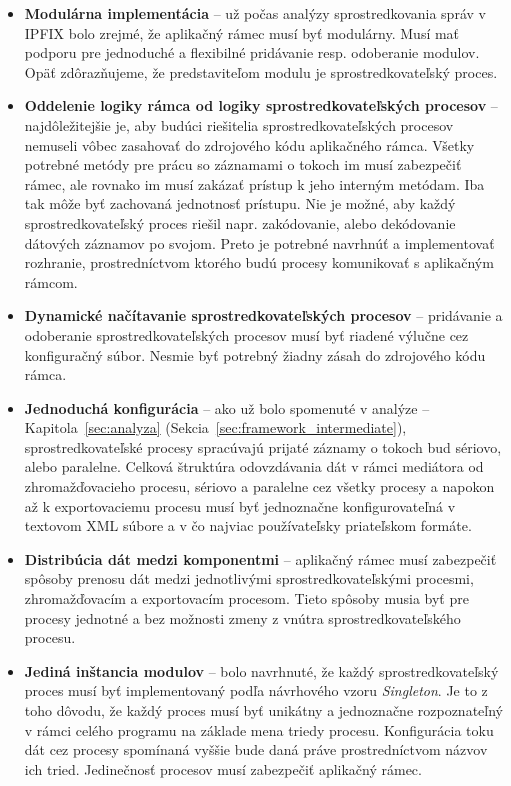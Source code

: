 \begin{itemize}
 \item \textbf{Modulárna implementácia} -- už počas analýzy sprostredkovania správ v IPFIX bolo zrejmé, že 
 aplikačný rámec musí byť modulárny. Musí mať podporu pre jednoduché a flexibilné pridávanie resp. 
 odoberanie modulov. Opäť zdôrazňujeme, že predstaviteľom modulu je sprostredkovateľský proces.
 
  \item \textbf{Oddelenie logiky rámca od logiky sprostredkovateľských procesov} -- 
  najdôležitejšie je, aby budúci riešitelia sprostredkovateľských procesov nemuseli vôbec zasahovať 
  do zdrojového kódu aplikačného rámca. Všetky potrebné metódy pre prácu so záznamami o tokoch 
  im musí zabezpečiť rámec, ale rovnako im musí zakázať prístup k jeho interným metódam. 
  Iba tak môže byť zachovaná jednotnosť prístupu. Nie je možné, aby každý sprostredkovateľský proces 
  riešil napr. zakódovanie, alebo dekódovanie dátových záznamov po svojom. Preto je potrebné navrhnúť 
  a implementovať rozhranie, prostredníctvom ktorého budú procesy komunikovať s aplikačným rámcom.
  
 \item \textbf{Dynamické načítavanie sprostredkovateľských procesov} -- pridávanie a odoberanie 
 sprostredkovateľských procesov musí byť riadené výlučne cez konfiguračný súbor. Nesmie byť potrebný 
 žiadny zásah do zdrojového kódu  rámca.
 
 \item \textbf{Jednoduchá konfigurácia} -- ako už bolo spomenuté v analýze -- Kapitola~\ref{sec:analyza} 
 (Sekcia~\ref{sec:framework_intermediate}), 
 sprostredkovateľské procesy spracúvajú prijaté záznamy o tokoch bud sériovo, alebo paralelne. 
 Celková štruktúra odovzdávania dát v rámci mediátora od zhromažďovacieho procesu, sériovo a paralelne cez 
 všetky procesy a napokon až k exportovaciemu procesu musí byť jednoznačne konfigurovateľná v textovom 
 XML súbore a v čo najviac používateľsky priateľskom formáte. 
 
 \item \textbf{Distribúcia dát medzi komponentmi} -- aplikačný rámec musí zabezpečiť spôsoby prenosu dát medzi 
 jednotlivými sprostredkovateľskými procesmi, zhromažďovacím a exportovacím procesom. Tieto spôsoby 
 musia byť pre procesy jednotné a bez možnosti zmeny z vnútra sprostredkovateľského procesu.
 
 \item \textbf{Jediná inštancia modulov} -- bolo navrhnuté, že každý sprostredkovateľský
 proces musí byť implementovaný podľa návrhového vzoru \emph{Singleton}. Je to z toho dôvodu, že 
 každý proces musí byť unikátny a jednoznačne rozpoznateľný v rámci celého programu na 
 základe mena triedy procesu. Konfigurácia toku dát cez procesy spomínaná vyššie bude daná práve 
 prostredníctvom názvov ich tried. Jedinečnosť procesov musí zabezpečiť aplikačný rámec. 
 

\end{itemize}
